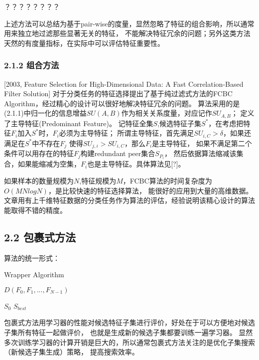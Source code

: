 \documentclass[a4paper,UTF8]{article}
\begin{document}
  ？？？？？？？？

  上述方法可以总结为基于pair-wise的度量，显然忽略了特征的组合影响，所以通常用来独立地过滤那些显著无关的特征，
  不能解决特征冗余的问题；另外这类方法天然的有度量指标，在实际中可以评估特征重要性。


\subsubsection*{2.1.2 组合方法}

[2003, Feature Selection for High-Dimensional Data: A Fast Correlation-Based Filter Solution]
对于分类任务的特征选择提出了基于纯过滤式方法的FCBC Algorithm，经过精心的设计可以很好地解决特征冗余的问题。
算法采用的是(2.1.1)中归一化的信息增益$SU(A,B)$作为相关关系度量，对应记作$SU_{A,B}$；
定义了主导特征(Predominant Feature)。
记特征全集$S$,候选特征子集$S^{*}$，在考虑把特征$F_{i}$加入$S^{*}$时，$F_{i}$必须为主导特征；
所谓主导特征，首先满足$SU_{i,C} > \delta$，如果还满足在$S^{*}$中不存在$F_{j}$
使得$SU_{j,i}>SU_{i,C}$，那么$F_{i}$是主导特征，
如果不满足第二个条件可以用存在的特征$F_{j}$构建redundant peer集合$S_{P_{i}}$，
然后依据算法缩减该集合，如果能缩减为空集，$F_{i}$也是主导特征。具体算法见[?]。

如果样本的数量规模为$N$,特征规模为$M$，FCBC算法的时间复杂度为$O(MNlogN)$，是比较快速的特征选择算法，
能很好的应用到大量的高维数据。文章用有上千维特征数据的分类任务作为算法的评估，经验说明该精心设计的算法能取得不错的精度。






\subsection*{2.2 包裹式方法}
算法的统一形式：
\begin{algorithm}
  \caption{Wrapper Algorithm}
  \begin{algorithmic}
    \REQUIRE $ D(F_{0}, F_{1},..., F_{N-1})$

             $ S_{0}$
    \ENSURE $ S_{best} $

  \end{algorithmic}




\end{algorithm}

包裹式方法用学习器的性能对候选特征子集进行评价，好处在于可以方便地对候选子集所有特征一起做评价，
也就是生成新的候选子集都要训练一遍学习器。
显然多次训练学习器的计算开销是巨大的，所以通常包裹式方法关注的是优化子集搜索（新候选子集生成）策略，
提高搜索效率。
\end{document}
